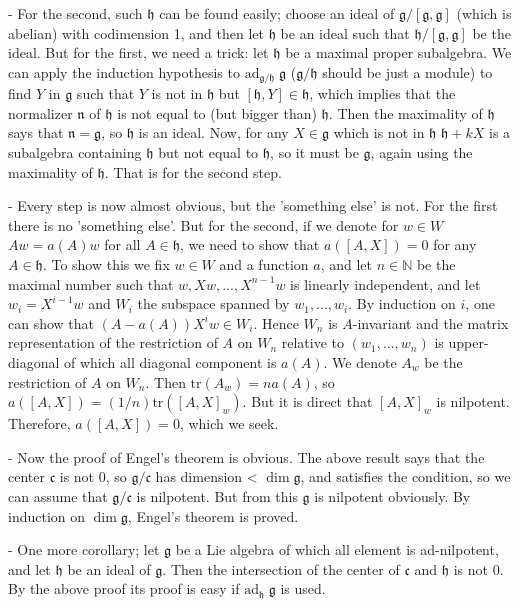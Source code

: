 \documentclass{article}
\newcommand{\NaN}{\mathbb{N}}
\newcommand{\tr}[1]{\mathrm{tr}#1}
\newcommand{\lie}[1]{\mathfrak{#1}}
\newcommand{\adu}[2]{\mathrm{ad}_{#1}\; #2}
\begin{document}
- For the second, such $\lie{h}$ can be found easily; choose an ideal of $\lie{g}/[\lie{g}, \lie{g}]$ (which is abelian) with codimension 1, and then let $\lie{h}$ be an ideal such that $\lie{h}/[\lie{g}, \lie{g}]$ be the ideal.
But for the first, we need a trick: let $\lie{h}$ be a maximal proper subalgebra.
We can apply the induction hypothesis to $\adu{\lie{g}/\lie{h}}{\lie{g}}$ ($\lie{g}/\lie{h}$ should be just a module) to find $Y$ in $\lie{g}$ such that $Y$ is not in $\lie{h}$ but $[\lie{h}, Y] \in \lie{h}$, which implies that the normalizer $\lie{n}$ of $\lie{h}$ is not equal to (but bigger than) $\lie{h}$.
Then the maximality of $\lie{h}$ says that $\lie{n} = \lie{g}$, so $\lie{h}$ is an ideal.
Now, for any $X \in \lie{g}$ which is not in $\lie{h}$ $\lie{h} + kX$ is a subalgebra containing $\lie{h}$ but not equal to $\lie{h}$, so it must be $\lie{g}$, again using the maximality of $\lie{h}$.
That is for the second step.

- Every step is now almost obvious, but the 'something else' is not.
For the first there is no 'something else'.
But for the second, if we denote for $w \in W$ $Aw = a(A)w$ for all $A \in \lie{h}$, we need to show that $a([A, X]) = 0$ for any $A \in \lie{h}$.
To show this we fix $w \in W$ and a function $a$, and let $n \in \NaN$ be the maximal number such that $w, Xw, ..., X^{n-1} w$ is linearly independent, and let $w_i = X^{i-1} w$ and $W_i$ the subspace spanned by $w_1, ..., w_i$.
By induction on $i$, one can show that $(A - a(A)) X^i w \in W_i$.
Hence $W_n$ is $A$-invariant and the matrix representation of the restriction of $A$ on $W_n$ relative to $(w_1, ..., w_n)$ is upper-diagonal of which all diagonal component is $a(A)$.
We denote $A_w$ be the restriction of $A$ on $W_n$.
Then $\tr{(A_w)} = na(A)$, so $a([A, X]) = (1/n) \tr{([A, X]_w)}$.
But it is direct that $[A, X]_w$ is nilpotent.
Therefore, $a([A, X]) = 0$, which we seek.

- Now the proof of Engel's theorem is obvious.
The above result says that the center $\lie{c}$ is not 0, so $\lie{g}/\lie{c}$ has dimension < $\dim{\lie{g}}$, and satisfies the condition, so we can assume that $\lie{g}/\lie{c}$ is nilpotent.
But from this $\lie{g}$ is nilpotent obviously.
By induction on $\dim{\lie{g}}$, Engel's theorem is proved.

- One more corollary; let $\lie{g}$ be a Lie algebra of which all element is ad-nilpotent, and let $\lie{h}$ be an ideal of $\lie{g}$.
Then the intersection of the center of $\lie{c}$ and $\lie{h}$ is not 0.
By the above proof its proof is easy if $\adu{\lie{h}}{\lie{g}}$ is used.
\end{document}
